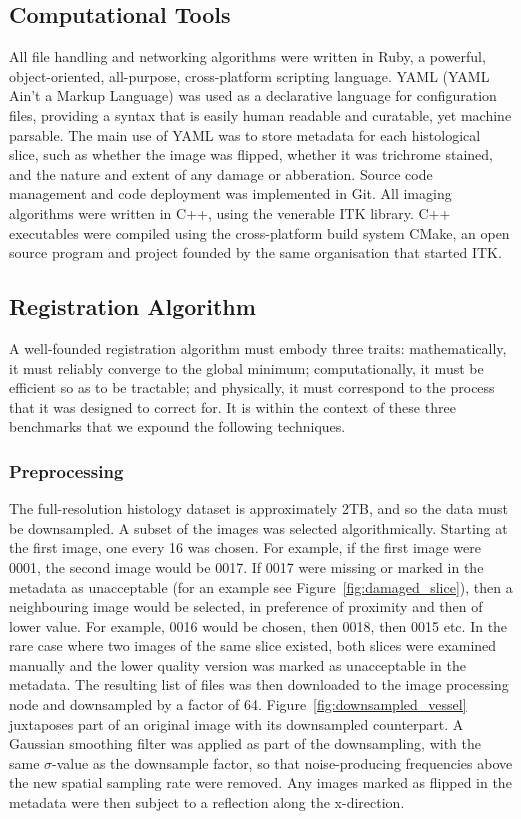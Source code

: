   \subsection{Computational Tools} %
  \label{sec:computational_tools}
    All file handling and networking algorithms were written in Ruby, a powerful, object-oriented, all-purpose, cross-platform scripting language. YAML (YAML Ain't a Markup Language) was used as a declarative language for configuration files, providing a syntax that is easily human readable and curatable, yet machine parsable. The main use of YAML was to store metadata for each histological slice, such as whether the image was flipped, whether it was trichrome stained, and the nature and extent of any damage or abberation. Source code management and code deployment was implemented in Git. All imaging algorithms were written in C++, using the venerable ITK library. C++ executables were compiled using the cross-platform build system CMake, an open source program and project founded by the same organisation that started ITK.
    
  \subsection{Registration Algorithm} %
  \label{sec:registration_algorithm}
    A well-founded registration algorithm must embody three traits: mathematically, it must reliably converge to the global minimum; computationally, it must be efficient so as to be tractable; and physically, it must correspond to the process that it was designed to correct for. It is within the context of these three benchmarks that we expound the following techniques.
    
    \subsubsection{Preprocessing} %
    \label{sub:preprocessing}
      The full-resolution histology dataset is approximately 2TB, and so the data must be downsampled. A subset of the images was selected algorithmically. Starting at the first image, one every 16 was chosen. For example, if the first image were 0001, the second image would be 0017. If 0017 were missing or marked in the metadata as unacceptable (for an example see Figure~\ref{fig:damaged_slice}), then a neighbouring image would be selected, in preference of proximity and then of lower value. For example, 0016 would be chosen, then 0018, then 0015 etc. In the rare case where two images of the same slice existed, both slices were examined manually and the lower quality version was marked as unacceptable in the metadata. The resulting list of files was then downloaded to the image processing node and downsampled by a factor of 64. Figure~\ref{fig:downsampled_vessel} juxtaposes part of an original image with its downsampled counterpart. A Gaussian smoothing filter was applied as part of the downsampling, with the same $\sigma$-value as the downsample factor, so that noise-producing frequencies above the new spatial sampling rate were removed. Any images marked as flipped in the metadata were then subject to a reflection along the x-direction.
      
